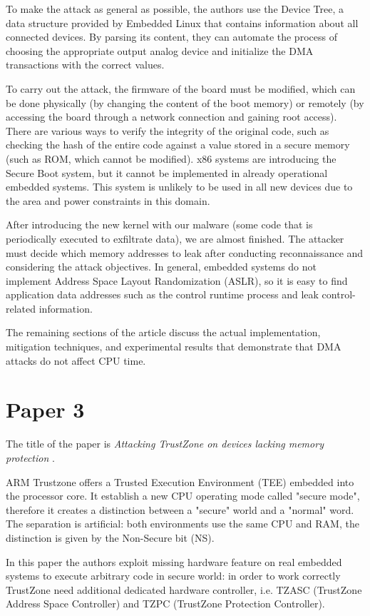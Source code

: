 To make the attack as general as possible, the authors use the Device Tree, a data structure provided by Embedded Linux that contains information about all connected devices. By parsing its content, they can automate the process of choosing the appropriate output analog device and initialize the DMA transactions with the correct values.

To carry out the attack, the firmware of the board must be modified, which can be done physically (by changing the content of the boot memory) or remotely (by accessing the board through a network connection and gaining root access). There are various ways to verify the integrity of the original code, such as checking the hash of the entire code against a value stored in a secure memory (such as ROM, which cannot be modified). x86 systems are introducing the Secure Boot system, but it cannot be implemented in already operational embedded systems. This system is unlikely to be used in all new devices due to the area and power constraints in this domain.

After introducing the new kernel with our malware (some code that is periodically executed to exfiltrate data), we are almost finished. The attacker must decide which memory addresses to leak after conducting reconnaissance and considering the attack objectives. In general, embedded systems do not implement Address Space Layout Randomization (ASLR), so it is easy to find application data addresses such as the control runtime process and leak control-related information.

The remaining sections of the article discuss the actual implementation, mitigation techniques, and experimental results that demonstrate that DMA attacks do not affect CPU time.

\section{Paper 3}
The title of the paper is \emph{Attacking TrustZone on devices lacking memory protection} \cite{10.1007/s11416-021-00413-y}. 

ARM Trustzone offers a Trusted Execution Environment (TEE) embedded into the processor core. It establish a new CPU operating mode called "secure mode", therefore it creates a distinction between a "secure" world and a "normal" word.  The separation is artificial: both environments use the same CPU and RAM, the distinction is given by the Non-Secure bit (NS).

In this paper the authors exploit missing hardware feature on real embedded systems to execute arbitrary code in secure world: in order to work correctly TrustZone need additional dedicated hardware controller, i.e. TZASC (TrustZone Address Space Controller) and TZPC (TrustZone Protection Controller).

